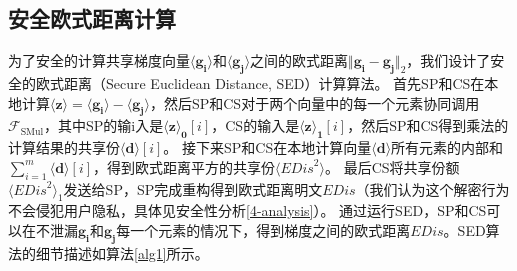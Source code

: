 \subsection{安全欧式距离计算}
为了安全的计算共享梯度向量$\boldsymbol{\langle g_i\rangle}$和$\boldsymbol{\langle g_j\rangle}$之间的欧式距离$\Vert \boldsymbol{g_i} - \boldsymbol{g_j} \Vert_2$，我们设计了安全的欧式距离（Secure Euclidean Distance, SED）计算算法。
首先SP和CS在本地计算$\boldsymbol{\langle z\rangle} = \boldsymbol{\langle g_i\rangle} - \boldsymbol{\langle g_j\rangle}$，然后SP和CS对于两个向量中的每一个元素协同调用$\mathcal{F}_{\text {SMul}}$，其中SP的输i入是$\boldsymbol{\langle z\rangle_0}[i]$，CS的输入是$\boldsymbol{\langle z\rangle_1}[i]$，然后SP和CS得到乘法的计算结果的共享份$\boldsymbol{\langle d\rangle}[i]$。
接下来SP和CS在本地计算向量$\boldsymbol{\langle d\rangle}$所有元素的内部和$\sum_{i=1}^{m} \boldsymbol{\langle d\rangle}[i]$，得到欧式距离平方的共享份$\langle \textit{EDis}^2\rangle$。
最后CS将共享份额$\langle \textit{EDis}^2\rangle_1$发送给SP，SP完成重构得到欧式距离明文$\textit{EDis}$（我们认为这个解密行为不会侵犯用户隐私，具体见安全性分析\ref{4-analysis}）。
通过运行SED，SP和CS可以在不泄漏$\boldsymbol{g_i}$和$\boldsymbol{g_j}$每一个元素的情况下，得到梯度之间的欧式距离$\textit{EDis}$。SED算法的细节描述如算法\ref{alg1}所示。

